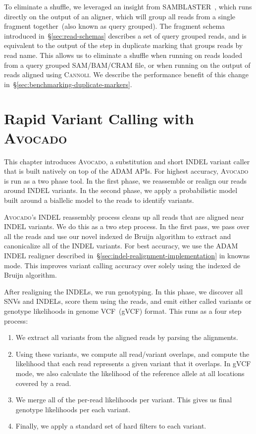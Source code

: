 \documentclass[phd]{ucbthesis}
\begin{document}
To eliminate a shuffle, we leveraged an insight from
\textsc{SAMBLASTER}~\cite{faust14}, which runs directly on the output of an
aligner, which will group all reads from a single fragment together~(also known
as query grouped). The fragment schema introduced in~\S\ref{sec:read-schemas}
describes a set of query grouped reads, and is equivalent to the output of the
step in duplicate marking that groups reads by read name. This allows us to
eliminate a shuffle when running on reads loaded from a query grouped
SAM/BAM/CRAM file, or when running on the output of reads aligned using
\textsc{Cannoli}. We describe the performance benefit of this change
in~\S\ref{sec:benchmarking-duplicate-markers}.

\chapter{Rapid Variant Calling with \textsc{Avocado}}
\label{chap:avocado}

This chapter introduces \textsc{Avocado}, a substitution and short INDEL variant
caller that is built natively on top of the \textsc{ADAM} APIs. For highest
accuracy, \textsc{Avocado} is run as a two phase tool. In the first phase, we
reassemble or realign our reads around INDEL variants. In the second phase, we
apply a probabilistic model built around a biallelic model to the reads to
identify variants.

\textsc{Avocado}'s INDEL reassembly process cleans up all reads that are aligned
near INDEL variants. We do this as a two step process. In the first pass, we
pass over all the reads and use our novel indexed de Bruijn algorithm to extract
and canonicalize all of the INDEL variants. For best accuracy, we use the
\textsc{ADAM} INDEL realigner described
in~\S\ref{sec:indel-realignment-implementation} in knowns mode. This improves
variant calling accuracy over solely using the indexed de Bruijn algorithm.

After realigning the INDELs, we run genotyping. In this phase, we discover all
SNVs and INDELs, score them using the reads, and emit either called variants
or genotype likelihoods in genome VCF~(gVCF) format. This runs as a four step
process:

\begin{enumerate}
\item We extract all variants from the aligned reads by parsing the alignments.
\item Using these variants, we compute all read/variant overlaps, and compute
the likelihood that each read represents a given variant that it overlaps. In
gVCF mode, we also calculate the likelihood of the reference allele at all
locations covered by a read.
\item We merge all of the per-read likelihoods per variant. This gives us final
genotype likelihoods per each variant.
\item Finally, we apply a standard set of hard filters to each variant.
\end{enumerate}
\end{document}
